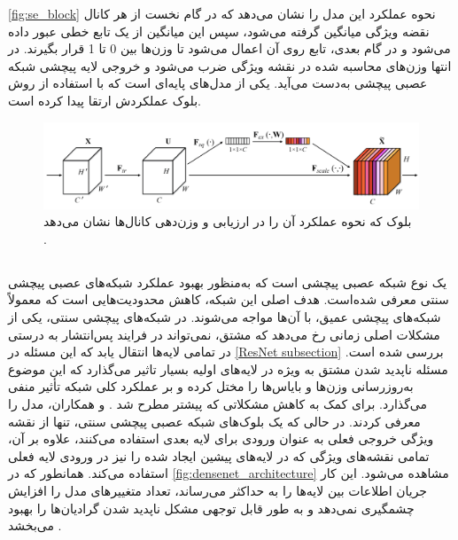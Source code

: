 \autoref{fig:se_block}
نحوه عملکرد این مدل را نشان می‌دهد که در گام نخست از هر کانال نقضه ویژگی میانگین گرفته می‌شود، سپس این میانگین از یک تابع خطی عبور داده می‌شود و در گام بعدی، تابع 
روی آن اعمال می‌شود تا وزن‌ها بین 0 تا 1 قرار بگیرند.
در انتها وزن‌های محاسبه شده در نقشه ویژگی ضرب می‌شود و خروجی لایه پیچشی 
 شبکه عصبی پیچشی به‌دست می‌آید.
 یکی از مدل‌های پایه‌ای است که با استفاده از روش بلوک
 عملکردش ارتقا پیدا کرده است.
 
\begin{figure}[h!]
    \centering
    \includegraphics[width=1\textwidth]{Images/Chapter2/squeeze and excitation.png}
    \caption{بلوک  که نحوه عملکرد آن را در ارزیابی و وزن‌دهی کانال‌ها نشان می‌دهد \cite{hu2018squeeze}.}
    \label{fig:se_block}
\end{figure}




\subsection{}

یک نوع شبکه‌ عصبی پیچشی است که به‌منظور بهبود عملکرد شبکه‌های عصبی پیچشی سنتی معرفی شده‌است. هدف اصلی این شبکه، کاهش محدودیت‌هایی است که معمولاً شبکه‌های پیچشی عمیق، با آن‌ها مواجه می‌شوند.
در شبکه‌های پیچشی سنتی، یکی از مشکلات اصلی زمانی رخ می‌دهد که مشتق، نمی‌تواند در فرایند پس‌انتشار به درستی در تمامی لایه‌ها انتقال یابد که این مسئله در
\autoref{ResNet subsection}
بررسی شده است. مسئله ناپدید شدن مشتق به ویژه در لایه‌های اولیه بسیار تاثیر می‌گذارد که این موضوع به‌روزرسانی وزن‌ها و بایاس‌ها را مختل کرده و بر عملکرد کلی شبکه تأثیر منفی می‌گذارد.
برای کمک به کاهش مشکلاتی که پیشتر مطرح شد
\cite{huang2017densely}.
\cite{huang2017densely}
و همکاران، مدل 
 ‌را معرفی کردند. در حالی که یک بلوک‌های شبکه عصبی پیچشی‌ سنتی، تنها از نقشه ویژگی خروجی فعلی به عنوان ورودی برای لایه بعدی استفاده می‌کنند،
   علاوه بر آن، تمامی نقشه‌های ویژگی که در لایه‌های پیشین ایجاد شده را نیز در ورودی لایه فعلی استفاده می‌کند. همانطور که در \autoref{fig:densenet_architecture} مشاهده می‌شود. این کار جریان اطلاعات بین لایه‌ها را به حداکثر می‌رساند، تعداد متغییرهای مدل را افزایش چشمگیری نمی‌دهد و به طور قابل توجهی مشکل ناپدید شدن گرادیان‌ها را بهبود می‌بخشد .

